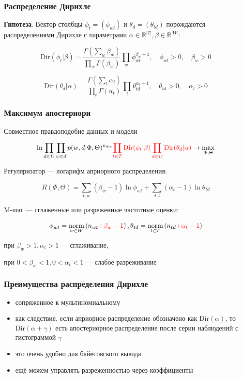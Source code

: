 \documentclass[fullscreen=true, bookmarks=true, hyperref={pdfencoding=unicode}]{beamer}
\begin{document}
\begin{frame}
  \frametitle{Распределение Дирихле}

  {\bf Гипотеза}. Вектор-столбцы $\phi_t = (\phi_{wt})$ и $\theta_d = (\theta_{td})$ порождаются распределениями Дирихле с параметрами $\alpha \in \mathbb{R}^{|T|}, \beta \in \mathbb{R}^{|W|}$:

  $$\text{Dir}(\phi_t | \beta) = \frac{\Gamma(\sum\limits_w \beta_w)}{\prod\limits_w \Gamma(\beta_w)} \prod\limits_w \phi_{wt}^{\beta_w-1}, \quad \phi_{wt} > 0, \quad \beta_w > 0 $$

  $$\text{Dir}(\theta_d | \alpha) = \frac{\Gamma(\sum\limits_t \alpha_t)}{\prod\limits_t \Gamma(\alpha_t)} \prod\limits_t \theta_{td}^{\alpha_t-1}, \quad \theta_{td} > 0, \quad \alpha_t > 0 $$
\end{frame}


\begin{frame}
  \frametitle{Максимум апостериори}

  Совместное правдоподобие данных и модели

  $$ \ln \prod\limits_{d \in D}\prod\limits_{w \in d} p(w, d | \Phi, \Theta)^{n_{dw}}
     {\color{red}\prod\limits_{t \in T}\text{Dir}(\phi_t|\beta) \prod\limits_{d \in D} \text{Dir}(\theta_d | \alpha)} \to \max\limits_{\Phi, \Theta}$$

  Регуляризатор — логарифм априорного распределения:

  $$ R(\Phi, \Theta) = \sum\limits_{t, w} \left(\beta_w - 1\right) \ln \phi_{wt} + \sum\limits_{d, t} \left(\alpha_t - 1\right) \ln \theta_{td} $$

  M-шаг — сглаженные или разреженные частотные оценки:

  $$ \phi_{wt} = \underset{w \in W}{\text{norm}}\left(n_{wt} {\color{red}+ \beta_{w} -1} \right),
     \theta_{td} = \underset{t \in T}{\text{norm}}\left(n_{td} {\color{red}+ \alpha_{t} - 1} \right) $$

  при $\beta_w > 1, \alpha_t > 1$ — сглаживание,

  при $0 < \beta_w < 1, 0 < \alpha_t < 1$ — слабое разреживание
\end{frame}


\begin{frame}
  \frametitle{Преимущества распределения Дирихле}

  \begin{itemize}
    \item сопряженное к мультиномиальному
    \item как следствие, если априорное распределение обозначено как $\text{Dir}(\alpha)$, то $\text{Dir}(\alpha + \gamma)$ есть апостериорное распределение после серии наблюдений с гистограммой $\gamma$
    \item это очень удобно для байесовского вывода
    \item ещё можем управлять разреженностью через коэффициенты
  \end{itemize}
\end{frame}
\end{document}
